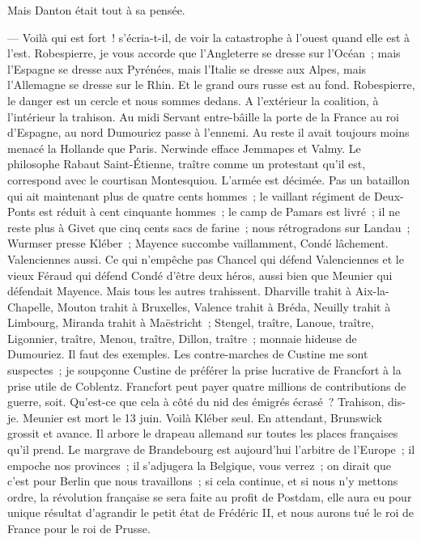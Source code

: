 \documentclass[french,twoside]{book} %
\begin{document}
Mais Danton était tout à sa pensée.\par
— Voilà qui est fort ! s’écria-t-il, de voir la catastrophe à l’ouest quand elle est à l’est. Robespierre, je vous accorde que l’Angleterre se dresse sur l’Océan ; mais l’Espagne se dresse aux Pyrénées, mais  l’Italie se dresse aux Alpes, mais l’Allemagne se dresse sur le Rhin. Et le grand ours russe est au fond. Robespierre, le danger est un cercle et nous sommes dedans. A l’extérieur la coalition, à l’intérieur la trahison. Au midi Servant entre-bâille la porte de la France au roi d’Espagne, au nord Dumouriez passe à l’ennemi. Au reste il avait toujours moins menacé la Hollande que Paris. Nerwinde efface Jemmapes et Valmy. Le philosophe Rabaut Saint-Étienne, traître comme un protestant qu’il est, correspond avec le courtisan Montesquiou. L’armée est décimée. Pas un bataillon qui ait maintenant plus de quatre cents hommes ; le vaillant régiment de Deux-Ponts est réduit à cent cinquante hommes ; le camp de Pamars est livré ; il ne reste plus à Givet que cinq cents sacs de farine ; nous rétrogradons sur Landau ; Wurmser presse Kléber ; Mayence succombe vaillamment, Condé lâchement. Valenciennes aussi. Ce qui n’empêche pas Chancel qui défend Valenciennes et le vieux Féraud qui défend Condé d’être deux héros, aussi bien que Meunier qui défendait Mayence. Mais tous les autres trahissent. Dharville trahit à Aix-la-Chapelle, Mouton trahit à Bruxelles, Valence trahit à Bréda, Neuilly trahit à Limbourg, Miranda trahit à Maëstricht ; Stengel, traître, Lanoue, traître, Ligonnier, traître, Menou, traître, Dillon, traître ; monnaie hideuse de Dumouriez. Il faut des exemples. Les contre-marches de Custine me sont suspectes ; je soupçonne Custine de préférer la prise lucrative de Francfort à la prise utile de Coblentz. Francfort peut payer quatre millions  de contributions de guerre, soit. Qu’est-ce que cela à côté du nid des émigrés écrasé ? Trahison, dis-je. Meunier est mort le 13 juin. Voilà Kléber seul. En attendant, Brunswick grossit et avance. Il arbore le drapeau allemand sur toutes les places françaises qu’il prend. Le margrave de Brandebourg est aujourd’hui l’arbitre de l’Europe ; il empoche nos provinces ; il s’adjugera la Belgique, vous verrez ; on dirait que c’est pour Berlin que nous travaillons ; si cela continue, et si nous n’y mettons ordre, la révolution française se sera faite au profit de Postdam, elle aura eu pour unique résultat d’agrandir le petit état de Frédéric II, et nous aurons tué le roi de France pour le roi de Prusse.\par
\end{document}
